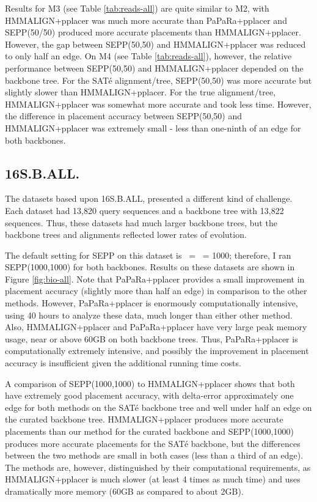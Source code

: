 Results for M3 (see Table \ref{tab:reads-all})
are quite similar to M2, 
with
HMMALIGN+pplacer was much more accurate than PaPaRa+pplacer
and SEPP(50/50) produced more accurate placements
than HMMALIGN+pplacer.  However, the gap between SEPP(50,50) and
HMMALIGN+pplacer was reduced to only half an edge.
On M4 (see Table \ref{tab:reads-all}), however, the relative performance between SEPP(50,50) and HMMALIGN+pplacer depended on
the backbone tree. 
For the SAT\'{e} alignment/tree, SEPP(50,50) was
more accurate but slightly slower than HMMALIGN+pplacer.
For the true alignment/tree, 
HMMALIGN+pplacer was somewhat more accurate and took less
time. However, the difference in placement
accuracy between SEPP(50,50) and
HMMALIGN+pplacer
was extremely small - less than one-ninth of an edge for both
backbones.


\subsection{16S.B.ALL.}  
The datasets based upon  16S.B.ALL,
presented a different kind of challenge.
Each dataset had 13,820 query sequences
and a backbone tree with 13,822 sequences.
Thus, these datasets had much
larger backbone trees, but the backbone trees
and alignments reflected lower rates of evolution.

The default setting for SEPP on this dataset is \ssa~= \ssp~= 1000;
therefore, I ran SEPP(1000,1000) for both backbones.
Results on these datasets are shown in Figure \ref{fig:bio-all}.
Note that PaPaRa+pplacer provides a small
improvement in placement accuracy (slightly more than
half an edge)
in comparison to the other methods.  However, 
PaPaRa+pplacer is enormously computationally intensive, using
40 hours to analyze these data, 
much longer than either other method.
Also,  HMMALIGN+pplacer and PaPaRa+pplacer have
very large peak memory usage, near or above 60GB on both
backbone trees.  Thus, PaPaRa+pplacer is 
computationally extremely intensive, 
and possibly the improvement in placement accuracy is insufficient
given the additional running time costs.

A comparison of SEPP(1000,1000) to HMMALIGN+pplacer
shows that both have extremely good
placement accuracy, with delta-error approximately
one edge for both methods on the SAT\'{e}
backbone tree and well under half an edge on the
curated backbone tree.  
 HMMALIGN+pplacer
produces more accurate placements than our method
for the curated backbone and SEPP(1000,1000) produces
more accurate placements for the SAT\'{e} backbone,
but the differences between the
two methods are small in both cases (less
than a third of an edge).
The methods are, however, distinguished by their
computational requirements, as HMMALIGN+pplacer is
much slower (at least 4 times as much
time) and uses dramatically more memory (60GB as
compared to about 2GB).

